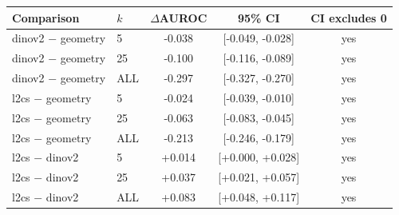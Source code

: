 \begin{tabular}{llccc}
\toprule
Comparison & $k$ & $\Delta$AUROC & 95\% CI & CI excludes 0 \\
\midrule
dinov2 $-$ geometry & 5 & -0.038 & [-0.049, -0.028] & yes \\
dinov2 $-$ geometry & 25 & -0.100 & [-0.116, -0.089] & yes \\
dinov2 $-$ geometry & ALL & -0.297 & [-0.327, -0.270] & yes \\
l2cs $-$ geometry & 5 & -0.024 & [-0.039, -0.010] & yes \\
l2cs $-$ geometry & 25 & -0.063 & [-0.083, -0.045] & yes \\
l2cs $-$ geometry & ALL & -0.213 & [-0.246, -0.179] & yes \\
l2cs $-$ dinov2 & 5 & +0.014 & [+0.000, +0.028] & yes \\
l2cs $-$ dinov2 & 25 & +0.037 & [+0.021, +0.057] & yes \\
l2cs $-$ dinov2 & ALL & +0.083 & [+0.048, +0.117] & yes \\
\bottomrule
\end{tabular}